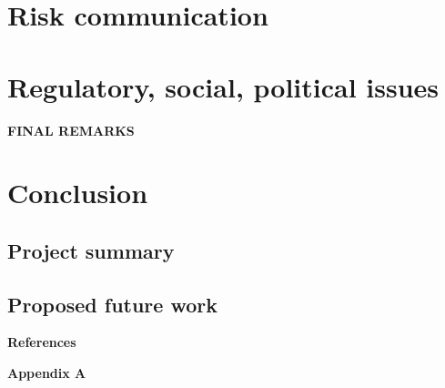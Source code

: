 \documentclass[11pt,a4paper]{article}
\begin{document}
\section{Risk communication}

\newpage

\section{Regulatory, social, political issues}

\newpage

\begin{center}
    \textbf{FINAL REMARKS}
\end{center}

\newpage

\section{Conclusion}
\subsection{Project summary}
\subsection{Proposed future work}

\newpage

\textbf{References}

\newpage

\textbf{Appendix A}
\end{document}
